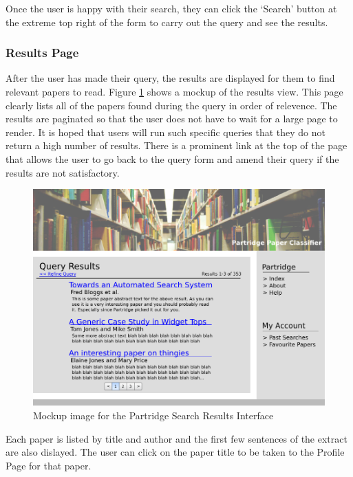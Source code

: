 Once the user is happy with their search, they can click the `Search' button
at the extreme top right of the form to carry out the query and see the
results.

\subsubsection{ Results Page }

After the user has made their query, the results are displayed for them
to find relevant papers to read. Figure \ref{fig:results_mockup} shows a
mockup of the results view. This page clearly lists all of the papers found
during the query in order of relevence. The results are paginated so that the user
does not have to wait for a large page to render. It is hoped that users will
run such specific queries that they do not return a high number of results. There is a
prominent link at the top of the page that allows the user to go back to the
query form and amend their query if the results are not satisfactory.

\begin{figure}[!htb]
\vspace{5mm}
\centering
\includegraphics[width=\textwidth]{images/design/results_mockup.png}
\caption{Mockup image for the Partridge Search Results Interface}
\label{fig:results_mockup}
\end{figure}

Each paper is listed by title and author and the first few sentences of the
extract are also dislayed. The user can click on the paper title to be taken to
the Profile Page for that paper.


